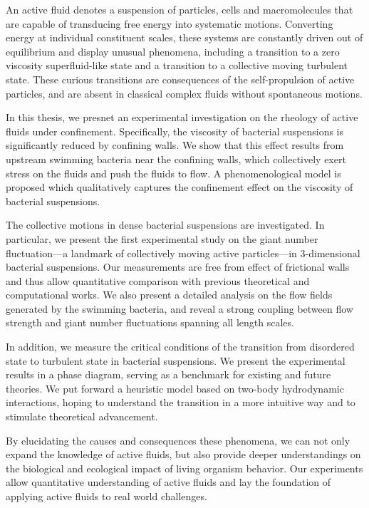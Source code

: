 An active fluid denotes a suspension of particles, cells and macromolecules that are capable of transducing free energy into systematic motions. Converting energy at individual constituent scales, these systems are constantly driven out of equilibrium and display unusual phenomena, including a transition to a zero viscosity superfluid-like state and a transition to a collective moving turbulent state. These curious transitions are consequences of the self-propulsion of active particles, and are absent in classical complex fluids without spontaneous motions.

In this thesis, we presnet an experimental investigation on the rheology of active fluids under confinement. Specifically, the viscosity of bacterial suspensions is significantly reduced by confining walls. We show that this effect results from upstream swimming bacteria near the confining walls, which collectively exert stress on the fluids and push the fluids to flow. A phenomenological model is proposed which qualitatively captures the confinement effect on the viscosity of bacterial suspensions.

The collective motions in dense bacterial suspensions are investigated. In particular, we present the first experimental study on the giant number fluctuation---a landmark of collectively moving active particles---in 3-dimensional bacterial suspensions. Our measurements are free from effect of frictional walls and thus allow quantitative comparison with previous theoretical and computational works. We also present a detailed analysis on the flow fields generated by the swimming bacteria, and reveal a strong coupling between flow strength and giant number fluctuations spanning all length scales.

In addition, we measure the critical conditions of the transition from disordered state to turbulent state in bacterial suspensions. We present the experimental results in a phase diagram, serving as a benchmark for existing and future theories. We put forward a heuristic model based on two-body hydrodynamic interactions, hoping to understand the transition in a more intuitive way and to stimulate theoretical advancement.

By elucidating the causes and consequences these phenomena, we can not only expand the knowledge of active fluids, but also provide deeper understandings on the biological and ecological impact of living organism behavior. Our experiments allow quantitative understanding of active fluids and lay the foundation of applying active fluids to real world challenges.
